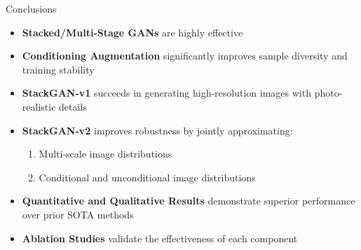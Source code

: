 \documentclass{beamer}
\begin{document}
\begin{frame}{Conclusions}
    \begin{itemize}
        \item \textbf{Stacked/Multi-Stage GANs} are highly effective
        \item \textbf{Conditioning Augmentation} significantly improves sample diversity and training stability
        \item \textbf{StackGAN-v1} succeeds in generating high-resolution images with photo-realistic details
        \item \textbf{StackGAN-v2} improves robustness by jointly approximating:
        \begin{enumerate}
            \item Multi-scale image distributions
            \item Conditional and unconditional image distributions
        \end{enumerate}
        \item \textbf{Quantitative and Qualitative Results} demonstrate superior performance over prior SOTA methods
        \item \textbf{Ablation Studies} validate the effectiveness of each component
    \end{itemize}
\end{frame}
\end{document}
